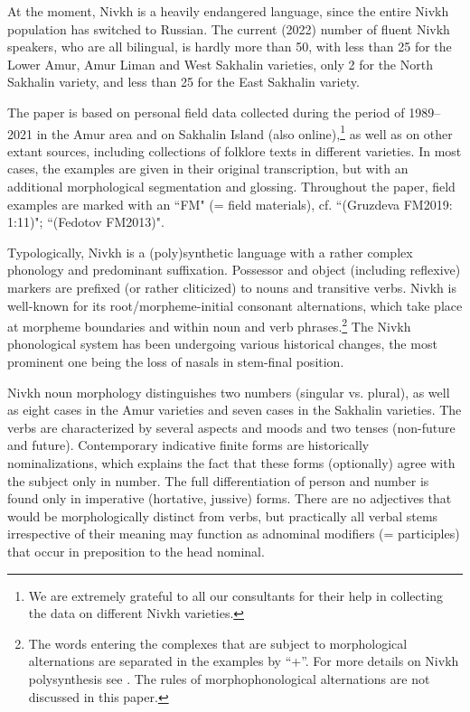\documentclass[output=paper,colorlinks,citecolor=brown]{langscibook}
\begin{document}
At the moment, Nivkh is a heavily endangered language, since the entire Nivkh population has switched to Russian. The current (2022) number of fluent Nivkh speakers, who are all bilingual, is hardly more than 50, with less than 25 for the Lower Amur, Amur Liman and West Sakhalin varieties, only 2 for the North Sakhalin variety, and less than 25 for the East Sakhalin variety.

The paper is based on personal field data collected during the period of 1989–2021 in the Amur area and on Sakhalin Island (also online),\footnote{We are extremely grateful to all our consultants for their help in collecting the data on different Nivkh varieties.} as well as on other extant sources, including collections of folklore texts in different varieties. In most cases, the examples are given in their original transcription, but with an additional morphological segmentation and glossing. Throughout the paper, field examples are marked with an ``FM" (= field materials), cf. ``(Gruzdeva FM2019: 1:11)"; ``(Fedotov FM2013)".

Typologically, Nivkh is a (poly)synthetic language with a rather complex phonology and predominant suffixation. Possessor and object (including reflexive) markers are prefixed (or rather cliticized) to nouns and transitive verbs. Nivkh is well-known for its root/morpheme-initial consonant alternations, which take place at morpheme boundaries and within noun and verb phrases.\footnote{The words entering the complexes that are subject to morphological alternations are separated in the examples by “+”. For more details on Nivkh polysynthesis see \citet{Mattissen2003}. The rules of morphophonological alternations are not discussed in this paper.}
The Nivkh phonological system has been undergoing various historical changes, the most prominent one being the loss of nasals in stem-final position.

Nivkh noun morphology distinguishes two numbers (singular vs. plural), as well as eight cases in the Amur varieties and seven cases in the Sakhalin varieties. The verbs are characterized by several aspects and moods and two tenses (non-future and future). Contemporary indicative finite forms are historically nominalizations, which explains the fact that these forms (optionally) agree with the subject only in number. The full differentiation of person and number is found only in imperative (hortative, jussive) forms. There are no adjectives that would be morphologically distinct from verbs, but practically all verbal stems irrespective of their meaning may function as adnominal modifiers (= participles) that occur in preposition to the head nominal.
\end{document}
